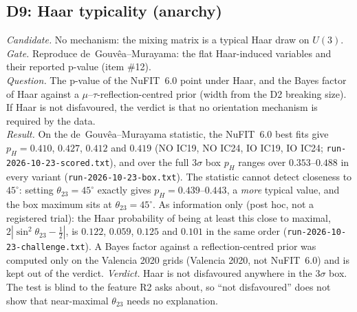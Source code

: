 \subsection{D9: Haar typicality (anarchy)}\label{sec:D9}
\emph{Candidate.} No mechanism: the mixing matrix is a typical Haar draw on $U(3)$.\\
\emph{Gate.} Reproduce de~Gouv\^ea--Murayama: the flat Haar-induced variables and their reported
p-value (item \#12).\\
\emph{Question.} The p-value of the NuFIT~6.0 point under Haar, and the Bayes factor of Haar
against a $\mu$--$\tau$-reflection-centred prior (width from the D2 breaking size). If Haar is not
disfavoured, the verdict is that no orientation mechanism is required by the data.\\
\emph{Result.} On the de~Gouv\^ea--Murayama statistic, the NuFIT~6.0 best fits give
$p_H=0.410$, $0.427$, $0.412$ and $0.419$ (NO IC19, NO IC24, IO IC19, IO IC24;
\texttt{run-2026-10-23-scored.txt}), and over the full $3\sigma$ box $p_H$ ranges over
$0.353$--$0.488$ in every variant (\texttt{run-2026-10-23-box.txt}). The statistic cannot detect
closeness to $45^\circ$: setting $\theta_{23}=45^\circ$ exactly gives $p_H=0.439$--$0.443$, a
\emph{more} typical value, and the box maximum sits at $\theta_{23}=45^\circ$. As information only
(post hoc, not a registered trial): the Haar probability of being at least this close to maximal,
$2|\sin^2\theta_{23}-\tfrac12|$, is $0.122$, $0.059$, $0.125$ and $0.101$ in the same order
(\texttt{run-2026-10-23-challenge.txt}). A Bayes factor against a reflection-centred prior was
computed only on the Valencia 2020 grids (Valencia 2020, not NuFIT~6.0) and is kept out of the
verdict.\quad
\emph{Verdict.} Haar is not disfavoured anywhere in the $3\sigma$ box. The test is blind to the
feature R2 asks about, so ``not disfavoured'' does not show that near-maximal $\theta_{23}$ needs no
explanation.


